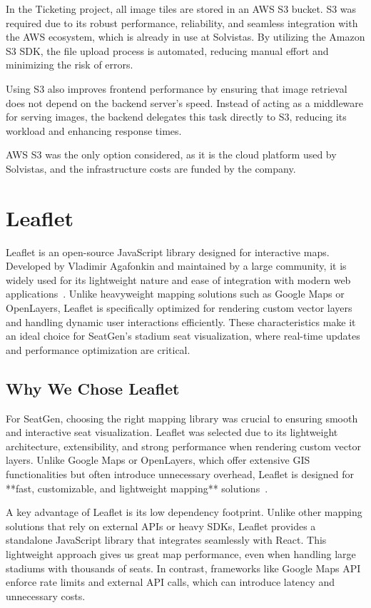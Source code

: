 In the Ticketing project, all image tiles are stored in an AWS S3 bucket. S3 was required due to its robust performance, reliability, and seamless integration with the AWS ecosystem, which is already in use at Solvistas. By utilizing the Amazon S3 SDK, the file upload process is automated, reducing manual effort and minimizing the risk of errors.

Using S3 also improves frontend performance by ensuring that image retrieval does not depend on the backend server’s speed. Instead of acting as a middleware for serving images, the backend delegates this task directly to S3, reducing its workload and enhancing response times.

AWS S3 was the only option considered, as it is the cloud platform used by Solvistas, and the infrastructure costs are funded by the company.

\section{Leaflet}
Leaflet is an open-source JavaScript library designed for interactive maps. Developed by Vladimir Agafonkin and maintained by a large community, it is widely used for its lightweight nature and ease of integration with modern web applications~\cite{Leaflet}. Unlike heavyweight mapping solutions such as Google Maps or OpenLayers, Leaflet is specifically optimized for rendering custom vector layers and handling dynamic user interactions efficiently. These characteristics make it an ideal choice for SeatGen’s stadium seat visualization, where real-time updates and performance optimization are critical.

\subsection{Why We Chose Leaflet}
For SeatGen, choosing the right mapping library was crucial to ensuring smooth and interactive seat visualization. Leaflet was selected due to its lightweight architecture, extensibility, and strong performance when rendering custom vector layers. Unlike Google Maps or OpenLayers, which offer extensive GIS functionalities but often introduce unnecessary overhead, Leaflet is designed for **fast, customizable, and lightweight mapping** solutions~\cite{Leaflet}. 

A key advantage of Leaflet is its low dependency footprint. Unlike other mapping solutions that rely on external APIs or heavy SDKs, Leaflet provides a standalone JavaScript library that integrates seamlessly with React. This lightweight approach gives us great map performance, even when handling large stadiums with thousands of seats. In contrast, frameworks like Google Maps API enforce rate limits and external API calls, which can introduce latency and unnecessary costs.

